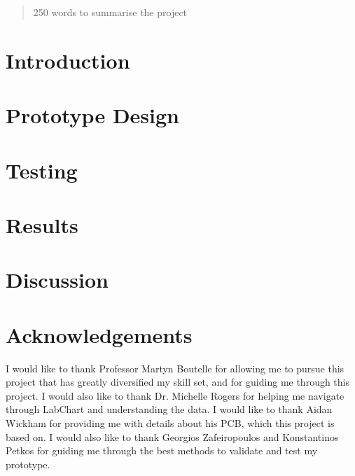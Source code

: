 \documentclass[12pt,twoside]{article}
\begin{document}


\begin{abstract}
    250 words to summarise the project
    
\end{abstract}

\newpage


\section{Introduction}

\newpage

\section{Prototype Design}

\newpage

\section{Testing}

\newpage

\section{Results}

\newpage

\section{Discussion}

\newpage



\section{Acknowledgements}
I would like to thank Professor Martyn Boutelle for allowing me to pursue this project that has greatly diversified my skill set, and for guiding me through this project. I would also like to thank Dr. Michelle Rogers for helping me navigate through LabChart and understanding the data. I would like to thank Aidan Wickham for providing me with details about his PCB, which this project is based on. I would also like to thank Georgios Zafeiropoulos and Konstantinos Petkos for guiding me through the best methods to validate and test my prototype. 
\end{document}
